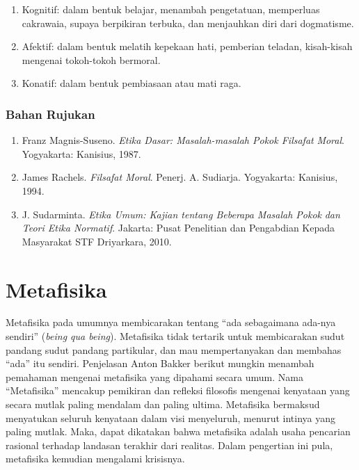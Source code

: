 \documentclass[11pt,twoside,a5paper,openany]{memoir}
\def\tightlist{}
\begin{document}
\begin{enumerate}
\def\labelenumi{\arabic{enumi}.}
\tightlist
\item
  Kognitif: dalam bentuk belajar, menambah pengetatuan, memperluas
  cakrawaia, supaya berpikiran terbuka, dan menjauhkan diri dari
  dogmatisme.
\item
  Afektif: dalam bentuk melatih kepekaan hati, pemberian teladan,
  kisah-kisah mengenai tokoh-tokoh bermoral.
\item
  Konatif: dalam bentuk pembiasaan atau mati raga.
\end{enumerate}

\hypertarget{bahan-rujukan-1}{%
\subsection{Bahan Rujukan}\label{bahan-rujukan-1}}

\begin{enumerate}
\def\labelenumi{\arabic{enumi}.}
\tightlist
\item
  Franz Magnis-Suseno. \emph{Etika Dasar: Masalah-masalah Pokok
  Filsafat} \emph{Moral}. Yogyakarta: Kanisius, 1987.
\item
  James Rachels. \emph{Filsafat Moral}. Penerj. A. Sudiarja. Yogyakarta:
  Kanisius, 1994.
\item
  J. Sudarminta. \emph{Etika Umum: Kajian tentang Beberapa Masalah
  Pokok} \emph{dan Teori Etika Normatif}. Jakarta: Pusat Penelitian dan
  Pengabdian Kepada Masyarakat STF Driyarkara, 2010.
\end{enumerate}

\hypertarget{metafisika}{%
\chapter{Metafisika}\label{metafisika}}

Metafisika pada umumnya membicarakan tentang ``ada sebagaimana ada-nya
sendiri'' (\emph{being qua being}). Metafisika tidak tertarik untuk
membicarakan sudut pandang sudut pandang partikular, dan mau
mempertanyakan dan membahas ``ada'' itu sendiri. Penjelasan Anton Bakker
berikut mungkin menambah pemahaman mengenai metafisika yang dipahami
secara umum. Nama ``Metafisika'' mencakup pemikiran dan refleksi
filosofis mengenai kenyataan yang secara mutlak paling mendalam dan
paling ultima. Metafisika bermaksud menyatukan seluruh kenyataan dalam
visi menyeluruh, menurut intinya yang paling mutlak. Maka, dapat
dikatakan bahwa metafisika adalah usaha pencarian rasional terhadap
landasan terakhir dari realitas. Dalam pengertian ini pula, metafisika
kemudian mengalami krisisnya.
\end{document}
